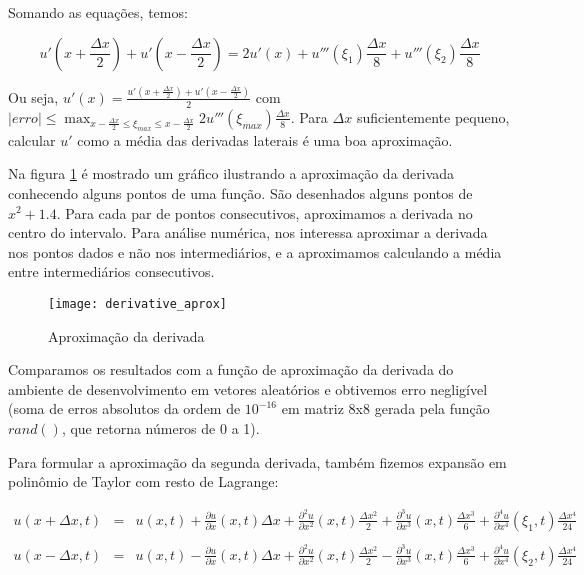 \documentclass[12pt,fleqn]{article}
\begin{document}
Somando as equações, temos:

\[
u'(x + \frac{\Delta x}{2}) + u'(x - \frac{\Delta x}{2}) = 2u'(x) + u'''(\xi_1) \frac{\Delta x}{8} + u'''(\xi_2) \frac{\Delta x}{8}
\]

Ou seja, $u'(x) = \frac{u'(x + \frac{\Delta x}{2}) + u'(x - \frac{\Delta x}{2})}{2}$ com $|erro| \leq \max_{x - \frac{\Delta x}{2} \leq \xi_{max} \leq x - \frac{\Delta x}{2}} 2u'''(\xi_{max}) \frac{\Delta x}{8}$. Para $\Delta x$ suficientemente pequeno, calcular $u'$ como a média das derivadas laterais é uma boa aproximação.

Na figura \ref{fig:derivative_aprox} é mostrado um gráfico ilustrando a aproximação da derivada conhecendo alguns pontos de uma função. São desenhados alguns pontos de $x^2 + 1.4$. Para cada par de pontos consecutivos, aproximamos a derivada no centro do intervalo. Para análise numérica, nos interessa aproximar a derivada nos pontos dados e não nos intermediários, e a aproximamos calculando a média entre intermediários consecutivos.

\begin{figure}[H]
	\centering
		\texttt{[image: derivative\_aprox]}
		\caption{Aproximação da derivada}
		\label{fig:derivative_aprox}
\end{figure}

Comparamos os resultados com a função de aproximação da derivada do ambiente de desenvolvimento em vetores aleatórios e obtivemos erro negligível (soma de erros absolutos da ordem de $10^{-16}$ em matriz 8x8 gerada pela função $rand()$, que retorna números de 0 a 1).

Para formular a aproximação da segunda derivada, também fizemos expansão em polinômio de Taylor com resto de Lagrange:

\[
\begin{array}{rcl}
	u(x + \Delta x, t) & = & u(x, t) + \frac{\partial u}{\partial x}(x, t) \Delta x + \frac{\partial^2 u}{\partial x^2}(x, t) \frac{\Delta x ^ 2}{2} + \frac{\partial^3 u}{\partial x^3}(x, t) \frac{\Delta x ^ 3}{6} + \frac{\partial^4 u}{\partial x^4}(\xi_1, t) \frac{\Delta x ^ 4}{24} \\ \\
	u(x - \Delta x, t) & = & u(x, t) - \frac{\partial u}{\partial x}(x, t) \Delta x + \frac{\partial^2 u}{\partial x^2}(x, t) \frac{\Delta x ^ 2}{2} - \frac{\partial^3 u}{\partial x^3}(x, t) \frac{\Delta x ^ 3}{6} + \frac{\partial^4 u}{\partial x^4}(\xi_2, t) \frac{\Delta x ^ 4}{24}
\end{array}
\]
\end{document}
